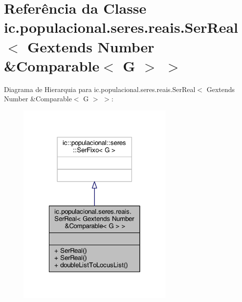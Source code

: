 \hypertarget{classic_1_1populacional_1_1seres_1_1reais_1_1_ser_real_3_01_gextends_01_number_01_6_comparable_3_01_g_01_4_01_4}{\section{Referência da Classe ic.\-populacional.\-seres.\-reais.\-Ser\-Real$<$ Gextends Number \&Comparable$<$ G $>$ $>$}
\label{classic_1_1populacional_1_1seres_1_1reais_1_1_ser_real_3_01_gextends_01_number_01_6_comparable_3_01_g_01_4_01_4}
}


Diagrama de Hierarquia para ic.\-populacional.\-seres.\-reais.\-Ser\-Real$<$ Gextends Number \&Comparable$<$ G $>$ $>$\-:
\nopagebreak
\begin{figure}[H]
\begin{center}
\leavevmode
\includegraphics[width=218pt]{classic_1_1populacional_1_1seres_1_1reais_1_1_ser_real_3_01_gextends_01_number_01_6_comparable_3_01_g_01_4_01_4__inherit__graph}
\end{center}
\end{figure}


